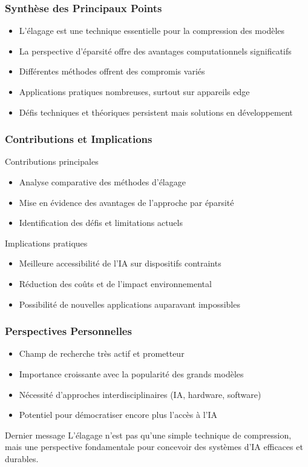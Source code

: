 \documentclass[10pt]{beamer}
\begin{document}
\begin{frame}
\frametitle{Synthèse des Principaux Points}
\begin{itemize}
    \item L'élagage est une technique essentielle pour la compression des modèles
    \item La perspective d'éparsité offre des avantages computationnels significatifs
    \item Différentes méthodes offrent des compromis variés
    \item Applications pratiques nombreuses, surtout sur appareils edge
    \item Défis techniques et théoriques persistent mais solutions en développement
\end{itemize}
\end{frame}

\begin{frame}
\frametitle{Contributions et Implications}
\begin{block}{Contributions principales}
\begin{itemize}
    \item Analyse comparative des méthodes d'élagage
    \item Mise en évidence des avantages de l'approche par éparsité
    \item Identification des défis et limitations actuels
\end{itemize}
\end{block}

\begin{block}{Implications pratiques}
\begin{itemize}
    \item Meilleure accessibilité de l'IA sur dispositifs contraints
    \item Réduction des coûts et de l'impact environnemental
    \item Possibilité de nouvelles applications auparavant impossibles
\end{itemize}
\end{block}
\end{frame}

\begin{frame}
\frametitle{Perspectives Personnelles}
\begin{itemize}
    \item Champ de recherche très actif et prometteur
    \item Importance croissante avec la popularité des grands modèles
    \item Nécessité d'approches interdisciplinaires (IA, hardware, software)
    \item Potentiel pour démocratiser encore plus l'accès à l'IA
\end{itemize}

\begin{alertblock}{Dernier message}
L'élagage n'est pas qu'une simple technique de compression, mais une perspective fondamentale pour concevoir des systèmes d'IA efficaces et durables.
\end{alertblock}
\end{frame}
\end{document}

